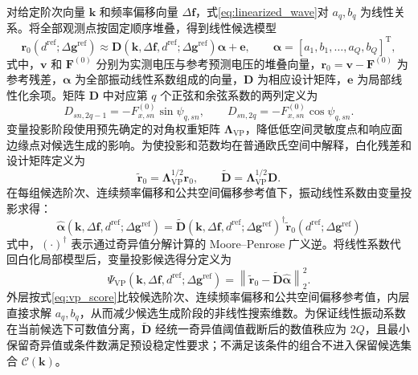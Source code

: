 \documentclass[UTF8,12pt,a4paper]{ctexart}
\begin{document}
对给定阶次向量 $\bm k$ 和频率偏移向量 $\Delta\bm f$，式\eqref{eq:linearized_wave}对 $a_q,b_q$ 为线性关系。将全部观测点按固定顺序堆叠，得到线性候选模型
\begin{equation}
\bm r_0(d^{\mathrm{ref}};\Delta\bm g^{\mathrm{ref}})
\approx
\bm D(\bm k,\Delta\bm f,d^{\mathrm{ref}};\Delta\bm g^{\mathrm{ref}})
\bm\alpha+\bm e,
\qquad
\bm\alpha=
[a_1,b_1,\ldots,a_Q,b_Q]^{\mathrm T},
\label{eq:vp_model}
\end{equation}
式中，$\bm v$ 和 $\bm F^{(0)}$ 分别为实测电压与参考预测电压的堆叠向量，$\bm r_0=\bm v-\bm F^{(0)}$ 为参考残差，$\bm\alpha$ 为全部振动线性系数组成的向量，$\bm D$ 为相应设计矩阵，$\bm e$ 为局部线性化余项。矩阵 $\bm D$ 中对应第 $q$ 个正弦和余弦系数的两列定义为
\begin{equation}
D_{sn,2q-1}=-F_{x,sn}^{(0)}\sin\psi_{q,sn},
\qquad
D_{sn,2q}=-F_{x,sn}^{(0)}\cos\psi_{q,sn}.
\label{eq:vp_design}
\end{equation}
变量投影阶段使用预先确定的对角权重矩阵 $\bm\Lambda_{\mathrm{VP}}$，降低低空间灵敏度点和响应面边缘点对候选生成的影响。为使投影和范数均在普通欧氏空间中解释，白化残差和设计矩阵定义为
\begin{equation}
\widetilde{\bm r}_0=\bm\Lambda_{\mathrm{VP}}^{1/2}\bm r_0,
\qquad
\widetilde{\bm D}=\bm\Lambda_{\mathrm{VP}}^{1/2}\bm D.
\label{eq:vp_whitening}
\end{equation}
在每组候选阶次、连续频率偏移和公共空间偏移参考值下，振动线性系数由变量投影求得\cite{Golub1973,Golub2003}：
\begin{equation}
\widehat{\bm\alpha}
(\bm k,\Delta\bm f,d^{\mathrm{ref}};\Delta\bm g^{\mathrm{ref}})
=\widetilde{\bm D}
(\bm k,\Delta\bm f,d^{\mathrm{ref}};\Delta\bm g^{\mathrm{ref}})^{\dagger}
\widetilde{\bm r}_0
(d^{\mathrm{ref}};\Delta\bm g^{\mathrm{ref}})
\label{eq:vp_solution}
\end{equation}
式中，$(\cdot)^{\dagger}$ 表示通过奇异值分解计算的 Moore--Penrose 广义逆。将线性系数代回白化局部模型后，变量投影候选得分定义为
\begin{equation}
\Psi_{\mathrm{VP}}
(\bm k,\Delta\bm f,d^{\mathrm{ref}};\Delta\bm g^{\mathrm{ref}})
=\left\lVert
\widetilde{\bm r}_0-
\widetilde{\bm D}\widehat{\bm\alpha}
\right\rVert_2^2.
\label{eq:vp_score}
\end{equation}
外层按式\eqref{eq:vp_score}比较候选阶次、连续频率偏移和公共空间偏移参考值，内层直接求解 $a_q,b_q$，从而减少候选生成阶段的非线性搜索维数。为保证线性振动系数在当前候选下可数值分离，$\widetilde{\bm D}$ 经统一奇异值阈值截断后的数值秩应为 $2Q$，且最小保留奇异值或条件数满足预设稳定性要求；不满足该条件的组合不进入保留候选集合 $\mathcal C(\bm k)$。
\end{document}
